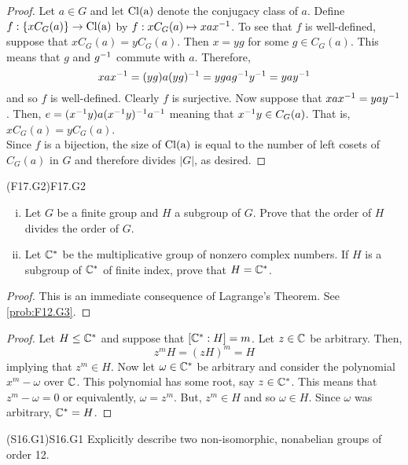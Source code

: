\documentclass[../AlgebraQualSolutions.tex]{subfiles}
\begin{document}
	\begin{proof}
		Let $a \in G$ and let $\rm{Cl}(a)$ denote the conjugacy class of $a$. Define $f: \{xC_G(a)\} \to \rm{Cl}(a)$ by $f: xC_G(a) \mapsto xax^{-1}$. To see that $f$ is well-defined, suppose that $xC_G(a) = yC_G(a)$. Then $x = yg$ for some $g \in C_G(a)$. This means that $g$ and $g^{-1}$ commute with $a$. Therefore,
			\[xax^{-1} = (yg)a(yg)^{-1} = ygag^{-1} y^{-1} = yay^{-1}\]
		and so $f$ is well-defined. Clearly $f$ is surjective. Now suppose that $xax^{-1} = yay^{-1}$. Then, $e = (x^{-1} y)a(x^{-1} y)^{-1} a^{-1}$ meaning that $x^{-1} y \in C_G(a)$. That is, $xC_G(a) = yC_G(a)$.\\
	
		Since $f$ is a bijection, the size of $\rm{Cl}(a)$ is equal to the number of left cosets of $C_G(a)$ in $G$ and therefore divides $|G|$, as desired.
	\end{proof}

\begin{prob}{(F17.G2)}{F17.G2}
	\begin{enumerate}[(i)]
		\item Let $G$ be a finite group and $H$ a subgroup of $G$. Prove that the order of $H$ divides the order of $G$.
		\item Let $\mathbb{C}^*$ be the multiplicative group of nonzero complex numbers. If $H$ is a subgroup of $\mathbb{C}^*$ of finite index, prove that $H = \mathbb{C}^*$.
	\end{enumerate}
\end{prob}

\begin{proof}
	This is an immediate consequence of Lagrange's Theorem. See \ref{prob:F12.G3}.
\end{proof}

\begin{proof}
	Let $H \leq \mathbb{C}^*$ and suppose that $[\mathbb{C}^*: H] = m$. Let $z \in \mathbb{C}$ be arbitrary. Then,
		\[z^mH = (zH)^m = H\]
	implying that $z^m \in H$. Now let $\omega \in \mathbb{C}^*$ be arbitrary and consider the polynomial $x^m - \omega$ over $\mathbb{C}$. This polynomial has some root, say $z \in \mathbb{C}^*$. This means that $z^m - \omega = 0$ or equivalently, $\omega = z^m$. But, $z^m \in H$ and so $\omega \in H$. Since $\omega$ was arbitrary, $\mathbb{C}^* = H$.
\end{proof}

\begin{prob}{(S16.G1)}{S16.G1}
	Explicitly describe two non-isomorphic, nonabelian groups of order 12.
\end{prob}
\end{document}
